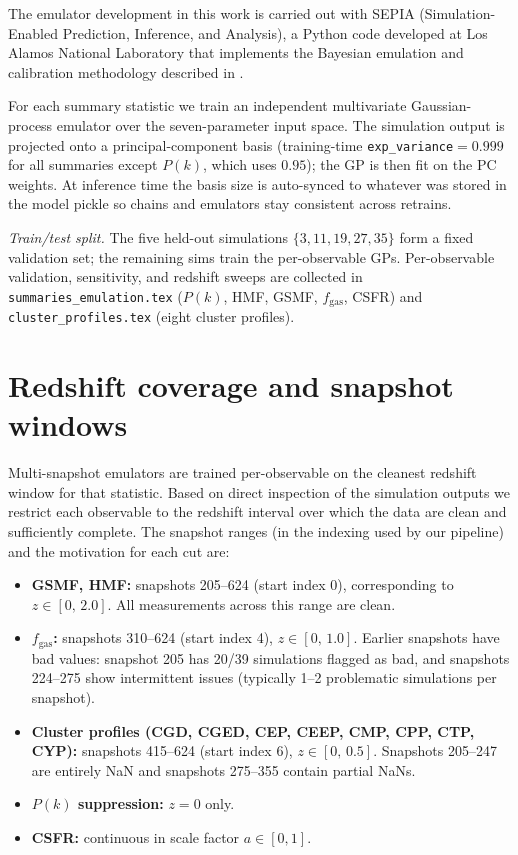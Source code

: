 \documentclass{article}
\begin{document}
The emulator development in this work is carried out with SEPIA (Simulation-Enabled Prediction, Inference, and Analysis), a Python code developed at Los Alamos National Laboratory \citep{james_gattiker_2020_4048801} that implements the Bayesian emulation and calibration methodology described in \cite{Higdon2008}.

For each summary statistic we train an independent multivariate Gaussian-process emulator over the seven-parameter input space. The simulation output is projected onto a principal-component basis (training-time \texttt{exp\_variance}$=0.999$ for all summaries except $P(k)$, which uses $0.95$); the GP is then fit on the PC weights. At inference time the basis size is auto-synced to whatever was stored in the model pickle so chains and emulators stay consistent across retrains.

\emph{Train/test split.} The five held-out simulations $\{3,11,19,27,35\}$ form a fixed validation set; the remaining sims train the per-observable GPs. Per-observable validation, sensitivity, and redshift sweeps are collected in \texttt{summaries\_emulation.tex} ($P(k)$, HMF, GSMF, $f_\mathrm{gas}$, CSFR) and \texttt{cluster\_profiles.tex} (eight cluster profiles).

\section{Redshift coverage and snapshot windows}\label{sec:z_dependence}

Multi-snapshot emulators are trained per-observable on the cleanest redshift window for that statistic. Based on direct inspection of the simulation outputs we restrict each observable to the redshift interval over which the data are clean and sufficiently complete. The snapshot ranges (in the indexing used by our pipeline) and the motivation for each cut are:

\begin{itemize}
  \item \textbf{GSMF, HMF:} snapshots 205--624 (start index 0), corresponding to $z \in [0,\,2.0]$. All measurements across this range are clean.
  \item \textbf{$f_{\mathrm{gas}}$:} snapshots 310--624 (start index 4), $z \in [0,\,1.0]$. Earlier snapshots have bad values: snapshot 205 has 20/39 simulations flagged as bad, and snapshots 224--275 show intermittent issues (typically 1--2 problematic simulations per snapshot).
  \item \textbf{Cluster profiles (CGD, CGED, CEP, CEEP, CMP, CPP, CTP, CYP):} snapshots 415--624 (start index 6), $z \in [0,\,0.5]$. Snapshots 205--247 are entirely NaN and snapshots 275--355 contain partial NaNs.
  \item \textbf{$P(k)$ suppression:} $z=0$ only.
  \item \textbf{CSFR:} continuous in scale factor $a\in[0,1]$.
\end{itemize}
\end{document}

